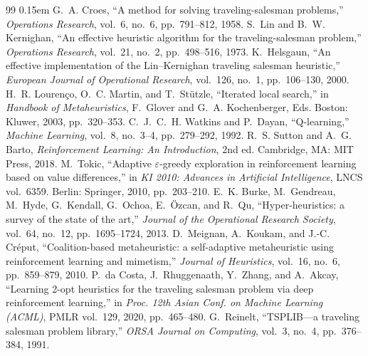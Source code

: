 \documentclass[10pt,twocolumn]{article}
\begin{document}
\begin{thebibliography}{99}
\itemsep0.15em
 G.~A. Croes, ``A method for solving traveling-salesman problems,'' \emph{Operations Research}, vol.~6, no.~6, pp.~791--812, 1958.
 S.~Lin and B.~W. Kernighan, ``An effective heuristic algorithm for the traveling-salesman problem,'' \emph{Operations Research}, vol.~21, no.~2, pp.~498--516, 1973.
 K.~Helsgaun, ``An effective implementation of the Lin--Kernighan traveling salesman heuristic,'' \emph{European Journal of Operational Research}, vol.~126, no.~1, pp.~106--130, 2000.
 H.~R. Louren\c{c}o, O.~C. Martin, and T.~St\"utzle, ``Iterated local search,'' in \emph{Handbook of Metaheuristics}, F.~Glover and G.~A. Kochenberger, Eds. Boston: Kluwer, 2003, pp.~320--353.
 C.~J.~C.~H. Watkins and P.~Dayan, ``Q-learning,'' \emph{Machine Learning}, vol.~8, no.~3--4, pp.~279--292, 1992.
 R.~S. Sutton and A.~G. Barto, \emph{Reinforcement Learning: An Introduction}, 2nd ed. Cambridge, MA: MIT Press, 2018.
 M.~Tokic, ``Adaptive $\varepsilon$-greedy exploration in reinforcement learning based on value differences,'' in \emph{KI 2010: Advances in Artificial Intelligence}, LNCS vol.~6359. Berlin: Springer, 2010, pp.~203--210.
 E.~K. Burke, M.~Gendreau, M.~Hyde, G.~Kendall, G.~Ochoa, E.~\"Ozcan, and R.~Qu, ``Hyper-heuristics: a survey of the state of the art,'' \emph{Journal of the Operational Research Society}, vol.~64, no.~12, pp.~1695--1724, 2013.
 D.~Meignan, A.~Koukam, and J.-C. Cr\'eput, ``Coalition-based metaheuristic: a self-adaptive metaheuristic using reinforcement learning and mimetism,'' \emph{Journal of Heuristics}, vol.~16, no.~6, pp.~859--879, 2010.
 P.~da Costa, J.~Rhuggenaath, Y.~Zhang, and A.~Akcay, ``Learning 2-opt heuristics for the traveling salesman problem via deep reinforcement learning,'' in \emph{Proc. 12th Asian Conf. on Machine Learning (ACML)}, PMLR vol.~129, 2020, pp.~465--480.
 G.~Reinelt, ``TSPLIB---a traveling salesman problem library,'' \emph{ORSA Journal on Computing}, vol.~3, no.~4, pp.~376--384, 1991.
\end{thebibliography}
\end{document}
